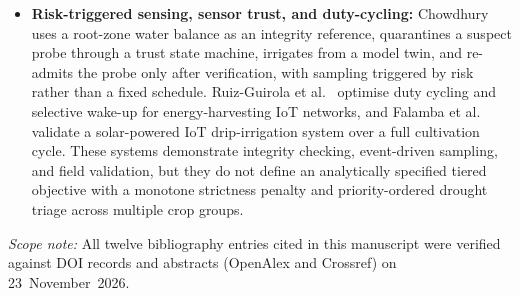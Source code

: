\documentclass[11pt,a4paper]{article}
\begin{document}
\begin{itemize}
  \item \textbf{Risk-triggered sensing, sensor trust, and duty-cycling:} Chowdhury~\cite{jalrakshak_2026} uses a root-zone water balance as an integrity reference, quarantines a suspect probe through a trust state machine, irrigates from a model twin, and re-admits the probe only after verification, with sampling triggered by risk rather than a fixed schedule. Ruiz-Guirola et al.~\cite{iot_wakeup_2026} optimise duty cycling and selective wake-up for energy-harvesting IoT networks, and Falamba et al.~\cite{solar_iot_2026} validate a solar-powered IoT drip-irrigation system over a full cultivation cycle. These systems demonstrate integrity checking, event-driven sampling, and field validation, but they do not define an analytically specified tiered objective with a monotone strictness penalty and priority-ordered drought triage across multiple crop groups.
\end{itemize}

\noindent\emph{Scope note:} All twelve bibliography entries cited in this manuscript were verified against DOI records and abstracts (OpenAlex and Crossref) on 23~November~2026.
\end{document}
